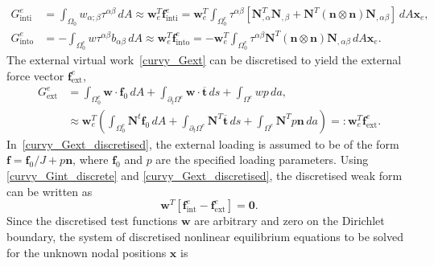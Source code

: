 \begin{align} \label{curvy_Gint_decomposed_discretised}
    G_{\text{inti}}^{e} &= \int_{\Omega_{0}} w_{\alpha;\beta} \tau^{\alpha \beta}\,dA \approx \mathbf{w}_{e}^{T} \mathbf{f}^{e}_{\text{inti}} = \mathbf{w}_{e}^{T} \int_{\Omega_{0}^{e}} \tau^{\alpha \beta}
    \left[ \mathbf{N}_{, \alpha}^{T} \mathbf{N}_{, \beta} + \mathbf{N}^{T} \left( \boldsymbol{n} \otimes \boldsymbol{n} \right) \mathbf{N}_{, \alpha \beta} \right]\,dA \mathbf{x}_{e},\\
    G_{\text{into}}^{e} &= -\int_{\Omega_{0}^{e}} w \tau^{\alpha \beta} b_{\alpha \beta}\,dA 
    \approx \mathbf{w}_{e}^{T} \mathbf{f}^{e}_{\text{into}} = - \mathbf{w}_{e}^{T}\int_{\Omega_{0}^{e}} \tau^{\alpha \beta}\mathbf{N}^{T} \left( \boldsymbol{n} \otimes \boldsymbol{n} \right) \mathbf{N}_{, \alpha \beta}\,dA \mathbf{x}_{e}.
\end{align}
The external virtual work~\eqref{curvy_Gext} can be discretised to yield the external force vector $\mathbf{f}^{e}_{\text{ext}}$, 
\begin{equation}\label{curvy_Gext_discretised}
    \begin{split}
        G_{\text{ext}}^{e} &= \int_{\Omega_{0}^{e}} \boldsymbol{w} \cdot \boldsymbol{f}_{0}\,dA + \int_{\partial_{t}\Omega^{e}} \boldsymbol{w}\cdot \overline{\boldsymbol{t}}\,ds + \int_{\Omega^{e}} wp \,da,\\
        &\approx \mathbf{w}^{T}_{e} \left(\int_{\Omega_{0}^{e}} \mathbf{N}^{t} \boldsymbol{f}_{0} \,dA + \int_{\partial_{t} \Omega^{e}} \mathbf{N}^{T} \overline{\boldsymbol{t}}\,ds + \int_{\Omega^{e}} \mathbf{N}^{T} p \boldsymbol{n} \,da \right) =: \mathbf{w}^{T}_{e} \mathbf{f}^{e}_{\text{ext}}.
    \end{split}
\end{equation}
In~\eqref{curvy_Gext_discretised}, the external loading is assumed to be of the form $\boldsymbol{f} = \boldsymbol{f}_{0}/J + p\boldsymbol{n}$, where $\boldsymbol{f}_{0}$ and $p$ are the specified loading parameters. 
Using \eqref{curvy_Gint_discrete} and \eqref{curvy_Gext_discretised}, the discretised weak form can be written as
\begin{equation} \label{curvy_weak_form_discretised}
    \mathbf{w}^{T}\left[\mathbf{f}^{e}_{\text{int}} - \mathbf{f}^{e}_{\text{ext}}\right] = \boldsymbol{0}.
\end{equation}
Since the discretised test functions $\mathbf{w}$ are arbitrary and zero on the Dirichlet boundary, the system of discretised nonlinear equilibrium equations
 to be solved for the unknown nodal positions $\mathbf{x}$ is
